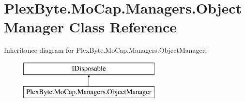 \hypertarget{class_plex_byte_1_1_mo_cap_1_1_managers_1_1_object_manager}{}\section{Plex\+Byte.\+Mo\+Cap.\+Managers.\+Object\+Manager Class Reference}
\label{class_plex_byte_1_1_mo_cap_1_1_managers_1_1_object_manager}
Inheritance diagram for Plex\+Byte.\+Mo\+Cap.\+Managers.\+Object\+Manager\+:\begin{figure}[H]
\begin{center}
\leavevmode
\includegraphics[height=2.000000cm]{class_plex_byte_1_1_mo_cap_1_1_managers_1_1_object_manager}
\end{center}
\end{figure}
